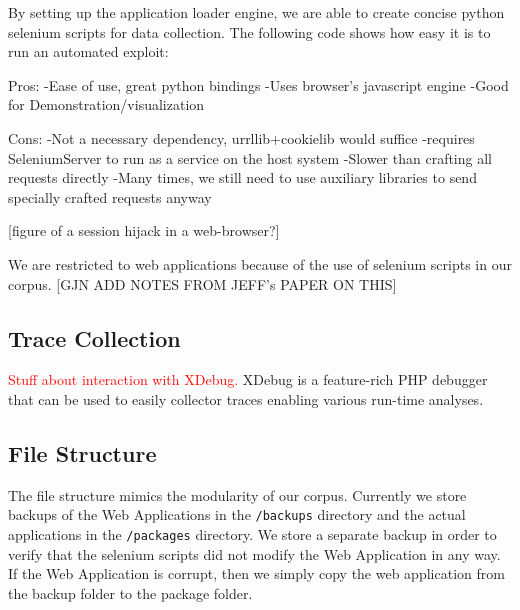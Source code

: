 \documentclass[letterpaper,twocolumn,10pt]{article}
\begin{document}
By setting up the application loader engine, we are able to create concise python selenium scripts for data collection.  The following code shows how easy it is to run an automated exploit:

Pros:
-Ease of use, great python bindings
-Uses browser's javascript engine
-Good for Demonstration/visualization

Cons:
-Not a necessary dependency, urrllib+cookielib would suffice
-requires SeleniumServer to run as a service on the host system
-Slower than crafting all requests directly
-Many times, we still need to use auxiliary libraries to send specially crafted requests anyway

[figure of a session hijack in a web-browser?]

We are restricted to web applications because of the use of selenium scripts in our corpus. [GJN ADD NOTES FROM JEFF's PAPER ON THIS]  


%
%
%

%


\subsection{Trace Collection}
\textcolor{red}{
Stuff about interaction with XDebug.
}
XDebug is a feature-rich PHP debugger that can be used to easily collector traces enabling various run-time analyses.\par

\subsection{File Structure}

The file structure mimics the modularity of our corpus.  Currently we store backups of the Web Applications in the {\tt/backups} directory and the actual applications in the {\tt/packages} directory.  We store a separate backup in order to verify that the selenium scripts did not modify the Web Application in any way.  If the Web Application is corrupt, then we simply copy the web application from the backup folder to the package folder.  
\end{document}
